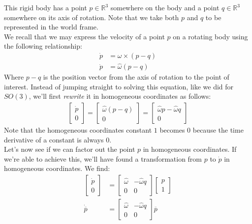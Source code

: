\documentclass[oneside]{book}
\begin{document}
This rigid body has a point $p\in \mathbb{R}^3$ somewhere on the body and a point $q\in \mathbb{R}^3$ somewhere on its axis of rotation. Note that we take both $p$ and $q$ to be represented in the world frame.\\
We recall that we may express the velocity of a point $p$ on a rotating body using the following relationship:
\begin{align}
    \dot p &= \omega \times (p - q)\\
    \dot p &= \hat\omega (p-q)
\end{align}
Where $p - q$ is the position vector from the axis of rotation to the point of interest. Instead of jumping straight to solving this equation, like we did for $SO(3)$, we'll first \textit{rewrite} it in homogeneous coordinates as follows:
\begin{align}
    \begin{bmatrix}
    \dot p\\
    0
    \end{bmatrix}
    = 
    \begin{bmatrix}
    \hat\omega (p-q)\\
    0
    \end{bmatrix}
    = 
    \begin{bmatrix}
    \hat\omega p- \hat\omega q\\
    0
    \end{bmatrix}
\end{align}
Note that the homogeneous coordinates constant $1$ becomes 0 because the time derivative of a constant is always 0.\\
Let's now see if we can factor out the point $p$ in homogeneous coordinates. If we're able to achieve this, we'll have found a transformation from $p$ to $\dot p$ in homogeneous coordinates. We find:
\begin{align}
    \begin{bmatrix}
    \dot p\\
    0
    \end{bmatrix}
    &= 
    \begin{bmatrix}
    \hat\omega & - \hat\omega q\\
    0 & 0
    \end{bmatrix}
    \begin{bmatrix}
    p\\
    1
    \end{bmatrix}\\
    \dot{\overline{p}} &= 
    \begin{bmatrix}
    \hat\omega & - \hat\omega q\\
    0 & 0
    \end{bmatrix}
    \overline{p}
\end{align}
\end{document}
